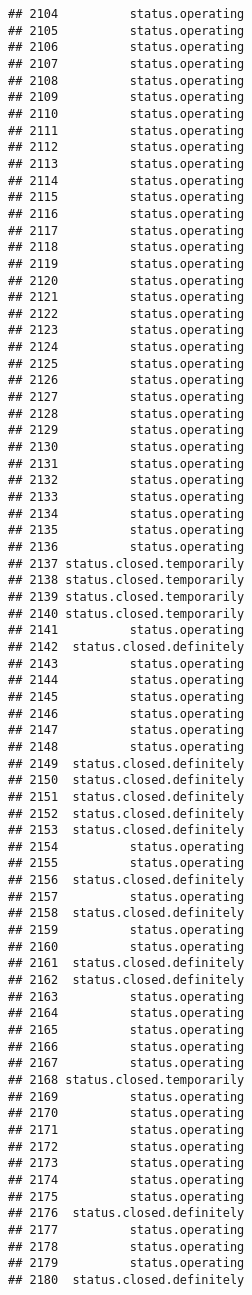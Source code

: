 \documentclass[
]{article}
\begin{document}
\begin{verbatim}
## 2104          status.operating
## 2105          status.operating
## 2106          status.operating
## 2107          status.operating
## 2108          status.operating
## 2109          status.operating
## 2110          status.operating
## 2111          status.operating
## 2112          status.operating
## 2113          status.operating
## 2114          status.operating
## 2115          status.operating
## 2116          status.operating
## 2117          status.operating
## 2118          status.operating
## 2119          status.operating
## 2120          status.operating
## 2121          status.operating
## 2122          status.operating
## 2123          status.operating
## 2124          status.operating
## 2125          status.operating
## 2126          status.operating
## 2127          status.operating
## 2128          status.operating
## 2129          status.operating
## 2130          status.operating
## 2131          status.operating
## 2132          status.operating
## 2133          status.operating
## 2134          status.operating
## 2135          status.operating
## 2136          status.operating
## 2137 status.closed.temporarily
## 2138 status.closed.temporarily
## 2139 status.closed.temporarily
## 2140 status.closed.temporarily
## 2141          status.operating
## 2142  status.closed.definitely
## 2143          status.operating
## 2144          status.operating
## 2145          status.operating
## 2146          status.operating
## 2147          status.operating
## 2148          status.operating
## 2149  status.closed.definitely
## 2150  status.closed.definitely
## 2151  status.closed.definitely
## 2152  status.closed.definitely
## 2153  status.closed.definitely
## 2154          status.operating
## 2155          status.operating
## 2156  status.closed.definitely
## 2157          status.operating
## 2158  status.closed.definitely
## 2159          status.operating
## 2160          status.operating
## 2161  status.closed.definitely
## 2162  status.closed.definitely
## 2163          status.operating
## 2164          status.operating
## 2165          status.operating
## 2166          status.operating
## 2167          status.operating
## 2168 status.closed.temporarily
## 2169          status.operating
## 2170          status.operating
## 2171          status.operating
## 2172          status.operating
## 2173          status.operating
## 2174          status.operating
## 2175          status.operating
## 2176  status.closed.definitely
## 2177          status.operating
## 2178          status.operating
## 2179          status.operating
## 2180  status.closed.definitely

\end{verbatim}
\end{document}
